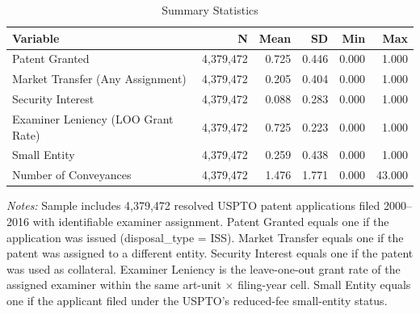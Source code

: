 \begin{table}[H]
\centering
\caption{Summary Statistics}
\label{tab:summary}
\begin{threeparttable}
\begin{tabular}{lrrrrr}
\toprule
Variable & N & Mean & SD & Min & Max \\
\midrule
Patent Granted & 4,379,472 & 0.725 & 0.446 & 0.000 & 1.000 \\
Market Transfer (Any Assignment) & 4,379,472 & 0.205 & 0.404 & 0.000 & 1.000 \\
Security Interest & 4,379,472 & 0.088 & 0.283 & 0.000 & 1.000 \\
Examiner Leniency (LOO Grant Rate) & 4,379,472 & 0.725 & 0.223 & 0.000 & 1.000 \\
Small Entity & 4,379,472 & 0.259 & 0.438 & 0.000 & 1.000 \\
Number of Conveyances & 4,379,472 & 1.476 & 1.771 & 0.000 & 43.000 \\
\bottomrule
\end{tabular}
\begin{tablenotes}[flushleft]
\small
\item \textit{Notes:} Sample includes 4,379,472 resolved USPTO patent applications filed 2000--2016 with identifiable examiner assignment. Patent Granted equals one if the application was issued (disposal\_type = ISS). Market Transfer equals one if the patent was assigned to a different entity. Security Interest equals one if the patent was used as collateral. Examiner Leniency is the leave-one-out grant rate of the assigned examiner within the same art-unit $\times$ filing-year cell. Small Entity equals one if the applicant filed under the USPTO's reduced-fee small-entity status.
\end{tablenotes}
\end{threeparttable}
\end{table}

